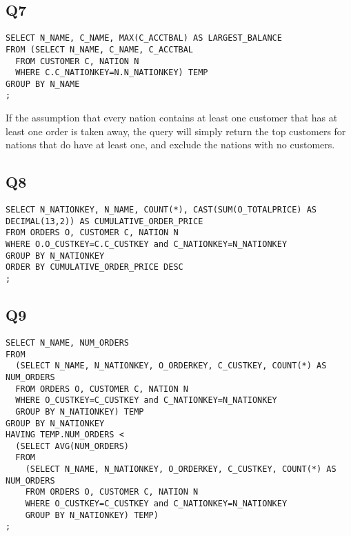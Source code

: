 \documentclass[12pt]{article}
\begin{document}
\subsection*{Q7}
\begin{verbatim}
SELECT N_NAME, C_NAME, MAX(C_ACCTBAL) AS LARGEST_BALANCE
FROM (SELECT N_NAME, C_NAME, C_ACCTBAL
  FROM CUSTOMER C, NATION N
  WHERE C.C_NATIONKEY=N.N_NATIONKEY) TEMP
GROUP BY N_NAME
;
\end{verbatim}
If the assumption that every nation contains at least one customer that has at least one order is taken away, the query will simply return the top customers for nations that do have at least one, and exclude the nations with no customers.

\subsection*{Q8}
\begin{verbatim}
SELECT N_NATIONKEY, N_NAME, COUNT(*), CAST(SUM(O_TOTALPRICE) AS DECIMAL(13,2)) AS CUMULATIVE_ORDER_PRICE
FROM ORDERS O, CUSTOMER C, NATION N
WHERE O.O_CUSTKEY=C.C_CUSTKEY and C_NATIONKEY=N_NATIONKEY
GROUP BY N_NATIONKEY
ORDER BY CUMULATIVE_ORDER_PRICE DESC
;
\end{verbatim}

\subsection*{Q9}
\begin{verbatim}
SELECT N_NAME, NUM_ORDERS
FROM
  (SELECT N_NAME, N_NATIONKEY, O_ORDERKEY, C_CUSTKEY, COUNT(*) AS NUM_ORDERS
  FROM ORDERS O, CUSTOMER C, NATION N
  WHERE O_CUSTKEY=C_CUSTKEY and C_NATIONKEY=N_NATIONKEY
  GROUP BY N_NATIONKEY) TEMP
GROUP BY N_NATIONKEY
HAVING TEMP.NUM_ORDERS < 
  (SELECT AVG(NUM_ORDERS)
  FROM
    (SELECT N_NAME, N_NATIONKEY, O_ORDERKEY, C_CUSTKEY, COUNT(*) AS NUM_ORDERS
    FROM ORDERS O, CUSTOMER C, NATION N
    WHERE O_CUSTKEY=C_CUSTKEY and C_NATIONKEY=N_NATIONKEY
    GROUP BY N_NATIONKEY) TEMP)
;
\end{verbatim}
\end{document}
